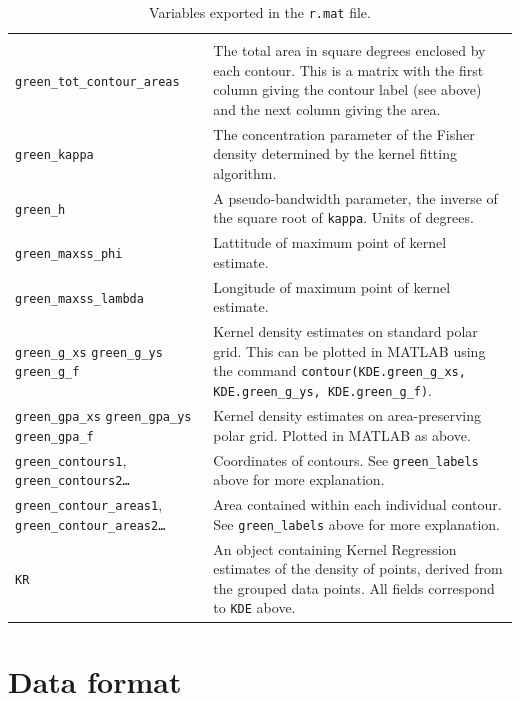 \documentclass{article}
\begin{document}
\begin{table}
\begin{tabularx}{\linewidth}{lX}
\begin{tabular}{p{1.5in}p{3in}}
      \texttt{green\_labels} relates to \texttt{green\_contours2} and
      so on. \\
      \texttt{green\_tot\_contour\_areas} & The total area in square
      degrees enclosed by each contour. This is a matrix with the
      first column giving the contour label (see above) and the
      next column giving the area. \\
      \texttt{green\_kappa} & The concentration parameter of
      the Fisher density determined by the kernel fitting algorithm. \\
      \texttt{green\_h} & A pseudo-bandwidth parameter, the inverse
      of the square root of \texttt{kappa}. Units of degrees. \\
      \texttt{green_maxss_phi} & Lattitude of maximum point of kernel
      estimate. \\
      \texttt{green_maxss_lambda} & Longitude of maximum point of kernel
      estimate. \\
      \texttt{green\_g\_xs} \texttt{green\_g\_ys} \texttt{green\_g\_f}
      & Kernel density estimates on standard polar grid. This can be
      plotted in MATLAB using the command
      \texttt{contour(KDE.green\_g\_xs, KDE.green\_g\_ys,
        KDE.green\_g\_f)}. \\
      \texttt{green\_gpa\_xs} \texttt{green\_gpa\_ys}
      \texttt{green\_gpa\_f} & Kernel density estimates on
      area-preserving polar grid. Plotted in MATLAB as above. \\
      \texttt{green\_contours1}, \texttt{green\_contours2\dots} &
      Coordinates of contours. See \texttt{green\_labels} above for
      more explanation. \\
      \texttt{green\_contour\_areas1},
      \texttt{green\_contour\_areas2\dots} & Area contained within each
      individual contour. See \texttt{green\_labels} above for more
      explanation.
    \end{tabular} \\
    \texttt{KR} & An object containing Kernel Regression estimates of the
    density of points, derived from the grouped data points. All
    fields correspond to \texttt{KDE} above.\\
    \hline
  \end{tabularx}
  \caption{Variables exported in the \texttt{r.mat} file.}
  \label{tab:matlab-export}
\end{table}

\appendix

\section{Data format}
\label{manual:sec:reading-data}
\end{document}
